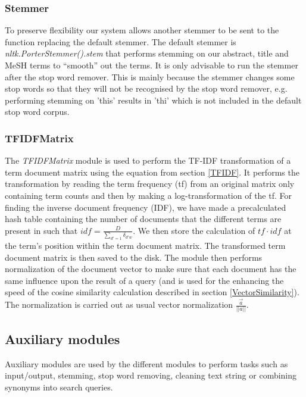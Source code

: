 \subsubsection{Stemmer}
To preserve flexibility our system allows another stemmer to be sent
to the function replacing the default stemmer. The default stemmer is
\textit{nltk.PorterStemmer().stem} that performs stemming on our
abstract, title and MeSH terms to ``smooth'' out the terms. It is only
advisable to run the stemmer after the stop word remover. This is
mainly because the stemmer changes some stop words so that they will
not be recognised by the stop word remover, e.g. performing stemming
on 'this' results in 'thi' which is not included in the default stop
word corpus.

\subsubsection{TFIDFMatrix}
The \textit{TFIDFMatrix} module is used to perform the TF-IDF
transformation of a term document matrix using the equation from
section \ref{TFIDF}. It performs the transformation by reading the
term frequency (tf) from an original matrix only containing term
counts and then by making a log-transformation of the tf. For finding
the inverse document frequency (IDF), we have made a precalculated
hash table containing the number of documents that the different terms
are present in such that $\mathit{idf} = \frac{D}{\sum_{d\prime =
    1}\delta_{d\prime w}}$. We then store the calculation of
$\mathit{tf} \cdot \mathit{idf}$ at the term's position within the term
document matrix. The transformed term document matrix is then saved to
the disk. The module then performs normalization of the document
vector to make sure that each document has the same influence upon the
result of a query (and is used for the enhancing the speed of the
cosine similarity calculation described in section
\ref{VectorSimilarity}). The normalization is carried out as usual vector
normalization $\frac{\overrightarrow{a}}{||a||}$.

\subsection{Auxiliary modules\label{AuxModules}}

Auxiliary modules are used by the different modules to perform tasks
such as input/output, stemming, stop word removing, cleaning text string
or combining synonyms into search queries.

